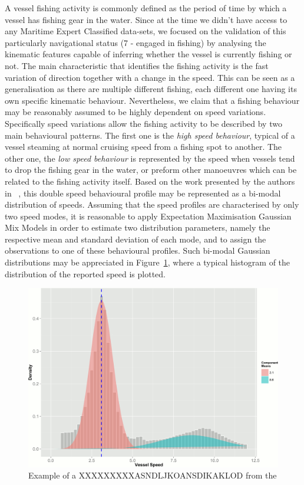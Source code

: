 A vessel fishing activity is commonly defined as the period of time by which a vessel has fishing gear in the water. Since at the time we didn't have access to any Maritime Expert Classified data-sets, we focused on the validation of this particularly navigational status (7 - engaged in fishing) by analysing the kinematic features capable of inferring whether the vessel is currently fishing or not. 
The main characteristic that identifies the fishing activity is the fast variation of direction together with a change in the speed. This can be seen as a generalisation as there are multiple different fishing, each different one having its own specific kinematic behaviour.
Nevertheless, we claim that a fishing behaviour may be reasonably assumed to be highly dependent on speed variations. Specifically speed variations allow the fishing activity to be described by two main behavioural patterns. The first one is the \emph{high speed behaviour}, typical of a vessel steaming at normal cruising speed from a fishing spot to another. The other one, the \emph{low speed behaviour} is represented by the speed when vessels tend to drop the fishing gear in the water, or preform other manoeuvres which can be related to the fishing activity itself. Based on the work presented by the authors in ~\cite{DeSouza2016ImprovingLearning, Natale2015MappingData, Mazzarella2014DiscoveringFootprints}, this double speed behavioural profile may be represented as a bi-modal distribution of speeds. Assuming that the speed profiles are characterised by only two speed modes, it is reasonable to apply Expectation Maximisation Gaussian Mix Models in order to estimate two distribution parameters, namely the respective mean and standard deviation of each mode, and to assign the observations to one of these behavioural profiles.
Such bi-modal Gaussian distributions may be appreciated in Figure~\ref{fig: 4 gmm_example}, where a typical histogram of the distribution of the reported speed is plotted.


\begin{figure}[H]
\centering
\includegraphics[scale = .7]{figures/Ch4/gmm_example.png}
\caption{Example of a XXXXXXXXXASNDLJKOANSDIKAKLOD from the }
\label{fig: 4 gmm_example}
\end{figure}


